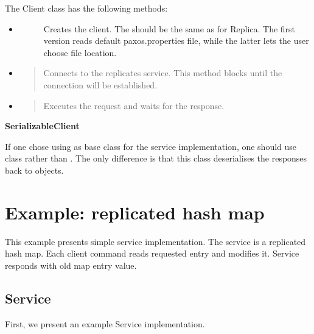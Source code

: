The Client class has the following methods:
\begin{itemize}
\item {} \begin{description}
\item[{}] \leavevmode
{}

Creates the client. The  should be the same as for Replica. The first version reads default paxos.properties file, while the latter lets the user choose file location.

\end{description}

\item {} 
\begin{quote}

Connects to the replicates service. This method blocks until the connection will be established.
\end{quote}

\item {} 
\begin{quote}

Executes the request and waits for the response.
\end{quote}

\end{itemize}

\textbf{SerializableClient}

If one chose using  as base class for the service implementation, one should use class  rather than . The only difference is that this class deserialises the responses back to objects.


\section{Example: replicated hash map}
\label{example::doc}\label{example:example-replicated-hash-map}
This example presents simple service implementation. The service is a replicated hash map. Each client command reads requested entry and modifies it. Service responds with old map entry value.


\subsection{Service}
\label{example:service}
First, we present an example Service implementation.

